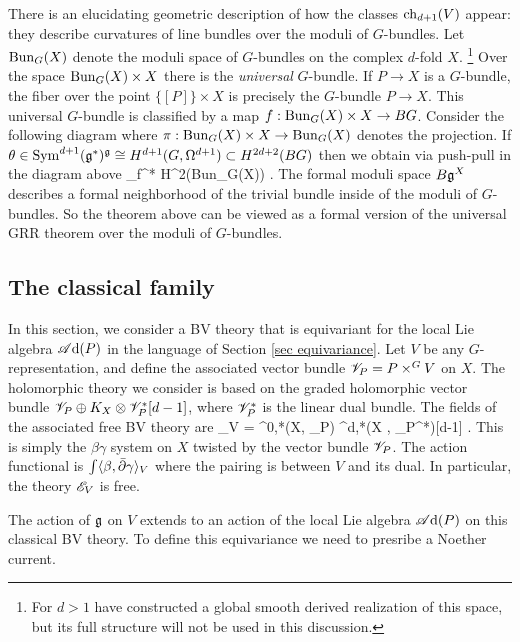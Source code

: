 \documentclass[10pt]{amsart}
\def\sAd{\sA{\rm d}}
\begin{document}
There is an elucidating geometric description of how the classes ${\rm ch}_{d+1}(V)$ appear: they describe curvatures of line bundles over the moduli of $G$-bundles.
Let ${\rm Bun}_{G}(X)$ denote the moduli space of $G$-bundles on the complex $d$-fold $X$. \footnote{For $d > 1$ \cite{FHK} have constructed a global smooth derived realization of this space, but its full structure will not be used in this discussion.}
Over the space ${\rm Bun}_G(X) \times X$ there is the {\em universal} $G$-bundle. 
If $P \to X$ is a $G$-bundle, the fiber over the point $\{[P]\} \times X$ is precisely the $G$-bundle $P \to X$. 
This universal $G$-bundle is classified by a map $f : {\rm Bun}_G(X) \times X \to B G$. 
Consider the following diagram
\ben
{}
\een
where $\pi : {\rm Bun}_G(X) \times X \to {\rm Bun}_G(X)$ denotes the projection. 
If $\theta \in {\rm Sym}^{d+1}(\mathfrak g^*)^\mathfrak g \cong H^{d+1}(G , \Omega^{d+1}) \subset H^{2d+2}(BG)$ then we obtain via push-pull in the diagram above
\ben
\int_\pi \circ f^* \theta \in H^2({\rm Bun}_G(X)) .
\een 
The formal moduli space $B \mathfrak g^X$ describes a formal neighborhood of the trivial bundle inside of the moduli of $G$-bundles.
So the theorem above can be viewed as a formal version of the universal GRR theorem over the moduli of $G$-bundles.



\subsection{The classical family}

In this section, we consider a BV theory that is equivariant for the local Lie algebra $\sAd(P)$ in the language of Section \ref{sec equivariance}. 
Let $V$ be any $G$-representation, and define the associated vector bundle $\mathscr V_P = P \times^G V$ on $X$.
The holomorphic theory we consider is based on the graded holomorphic vector bundle $\mathscr V_P \oplus K_X \otimes \mathscr V_P^* [d-1]$, where $\mathscr V^*_P$ is the linear dual bundle. 
The fields of the associated free BV theory are
\ben
\sE_V = \Omega^{0,*}(X, \sV_P) \oplus \Omega^{d,*}(X , \sV_P^*)[d-1] .
\een
This is simply the $\beta\gamma$ system on $X$ twisted by the vector bundle $\mathscr V_P$. 
The action functional is $\int \langle\beta, \Bar{\partial} \gamma\rangle_{V}$ where the pairing is between $V$ and its dual. 
In particular, the theory $\mathscr E_V$ is free.

The action of $\mathfrak g$ on $V$ extends to an action of the local Lie algebra $\sAd(P)$ on this classical BV theory.
To define this equivariance we need to presribe a Noether current. 
\end{document}
